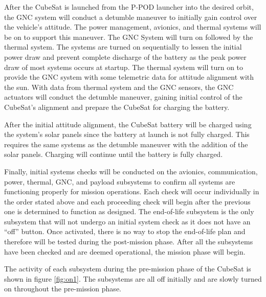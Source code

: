 After the CubeSat is launched from the P-POD launcher into the desired orbit, the GNC system will conduct a detumble maneuver to initially gain control over the vehicle's attitude. The power management, avionics, and thermal systems will be on to support this maneuver. The GNC System will turn on followed by the thermal system. The systems are turned on sequentially to lessen the initial power draw and prevent complete discharge of the battery as the peak power draw of most systems occurs at startup. The thermal system will turn on to provide the GNC system with some telemetric data for attitude alignment with the sun. With data from thermal system and the GNC sensors, the GNC actuators will conduct the detumble maneuver, gaining initial control of the CubeSat’s alignment and prepare the CubeSat for charging the battery. 

After the initial attitude alignment, the CubeSat battery will be charged using the system's solar panels since the battery at launch is not fully charged. This requires the same systems as the detumble maneuver with the addition of the solar panels. Charging will continue until the battery is fully charged. 

Finally, initial systems checks will be conducted on the avionics, communication, power, thermal, GNC, and payload subsystems to confirm all systems are functioning properly for mission operations. Each check will occur individually in the order stated above and each proceeding check will begin after the previous one is determined to function as designed. The end-of-life subsystem is the only subsystem that will not undergo an initial system check as it does not have an “off” button.  Once activated, there is no way to stop the end-of-life plan and therefore will be tested during the post-mission phase. After all the subsystems have been checked and are deemed operational, the mission phase will begin. 

The activity of each subsystem during the pre-mission phase of the CubeSat is shown in figure \ref{fig:on1}.  The subsystems are all off initially and are slowly turned on throughout the pre-mission phase. 

